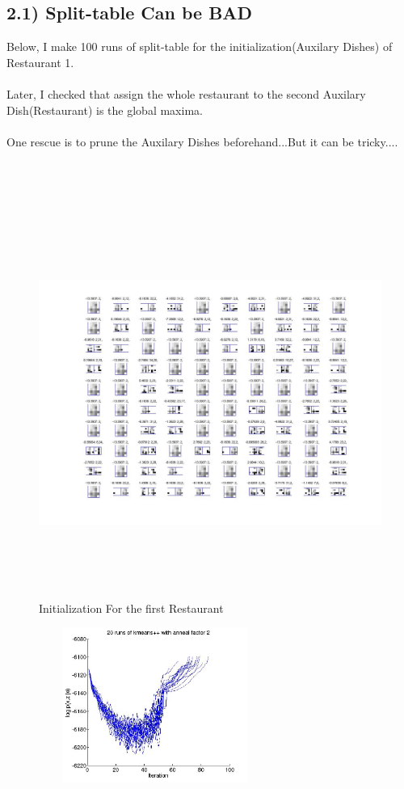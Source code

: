 \documentclass{article}
\begin{document}
\begin{spacing}{1.1}
\subsection{2.1) Split-table Can be BAD}
Below, I make 100 runs of split-table for the initialization(Auxilary Dishes) of Restaurant 1.\\ \\
Later, I checked that assign the whole restaurant to the second Auxilary Dish(Restaurant) is the global maxima.\\ \\
One rescue is to prune the Auxilary Dishes beforehand...But it can be tricky....\\ \\ \\ \\
\begin{figure}
    \centering 
    \includegraphics[width=7in,height=5in]{100_kmeans_2.jpg} 
    \caption{Initialization For the first Restaurant}
\end{figure}
\begin{figure}[h] 
  \begin{minipage}[b]{0.5\textwidth} 
    \centering 
    \includegraphics[width=3in,height=2in]{20_kmeans_2.jpg} 

\end{minipage}
\end{figure}
\end{spacing}
\end{document}
